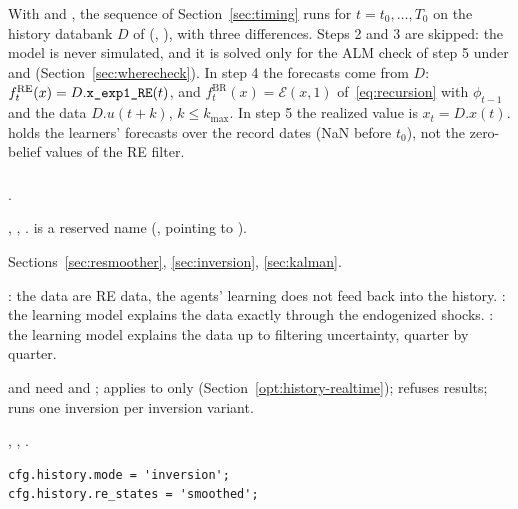 \documentclass[11pt,a4paper]{article}
\DeclareRobustCommand{\codem}[1]{\texttt{\detokenize{#1}}}
\newenvironment{optspec}%
  {\begin{description}[style=sameline,leftmargin=2.7cm,labelwidth=2.5cm,font=\normalfont\itshape]}%
  {\end{description}}
\newcommand{\RE}{\mathrm{RE}}
\newcommand{\BR}{\mathrm{BR}}
\newcommand{\fRE}{f^{\RE}}
\newcommand{\fBR}{f^{\BR}}
\begin{document}
With  and , the sequence of
Section~\ref{sec:timing} runs for $t = t_0,\dots,T_0$ on the history databank $D$ of
 (, ), with three
differences. Steps 2 and 3 are skipped: the model is never simulated, and it is solved only for
the ALM check of step 5 under  and  (Section~\ref{sec:wherecheck}).
In step 4 the forecasts come from $D$: $\fRE_t(x) = D.\codem{x_exp1_RE}(t)$, and
$\fBR_t(x) = \mathcal{E}(x,1)$ of~\eqref{eq:recursion} with $\phi_{t-1}$ and the data $D.u(t+k)$,
$k\le k_{\max}$. In step 5 the realized value is $x_t = D.x(t)$.  holds the learners' forecasts over the
record dates (NaN before $t_0$), not the zero-belief values of the RE filter.

\subsubsection{\texorpdfstring{\codem{history.mode}}{history.mode}}\label{opt:history-mode}
\begin{optspec}
  \item[Default] .
  \item[Values] , , .
         is a reserved name (,
        pointing to ).
  \item[Math] Sections~\ref{sec:resmoother}, \ref{sec:inversion}, \ref{sec:kalman}.
  \item[Assumptions] : the data are RE data, the agents' learning does not
        feed back into the history. : the learning model explains the data
        exactly through the endogenized shocks. : the learning model explains the
        data up to filtering uncertainty, quarter by quarter.
  \item[Interactions]  and  need  and
        ;  applies to
         only (Section~\ref{opt:history-realtime}); 
        refuses  results;  runs one inversion per
        inversion variant.
  \item[Code] , , .
  \item[Example]
\begin{lstlisting}
cfg.history.mode = 'inversion';
cfg.history.re_states = 'smoothed';
\end{lstlisting}
\end{optspec}
\end{document}
